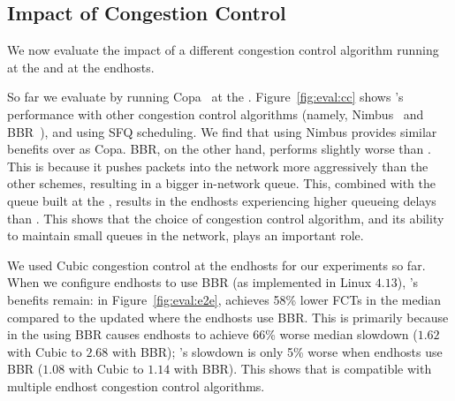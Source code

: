 \subsection{Impact of Congestion Control} \label{s:eval:cc}

We now evaluate the impact of a different congestion control algorithm running at the \inbox and at the endhosts.
% 




 So far we evaluate \name by running Copa~\cite{copa} at the \inbox.  Figure~\ref{fig:eval:cc} shows \name's performance with other congestion control algorithms (namely, Nimbus~\cite{nimbus} and BBR~\cite{bbr}), and using SFQ scheduling. We find that using Nimbus provides similar benefits over \baseline as Copa. BBR, on the other hand, performs slightly worse than \baseline. This is because it pushes packets into the network more aggressively than the other schemes, resulting in a bigger in-network queue. This, combined with the queue built at the \name, results in the endhosts experiencing higher queueing delays than \baseline. This shows that the choice of congestion control algorithm, and its ability to maintain small queues in the network, plays an important role. 


We used Cubic congestion control at the endhosts for our experiments so far. When we configure endhosts to use BBR (as implemented in Linux $4.13$), \name's benefits remain: in Figure~\ref{fig:eval:e2e}, \name achieves 58\% lower FCTs in the median compared to the updated \baseline where the endhosts use BBR. 
This is primarily because in the \baseline using BBR causes endhosts to achieve 66\% worse median slowdown ($1.62$ with Cubic to $2.68$ with BBR); \name's slowdown is only 5\% worse when endhosts use BBR ($1.08$ with Cubic to $1.14$ with BBR). 
This shows that \name is compatible with multiple endhost congestion control algorithms.

